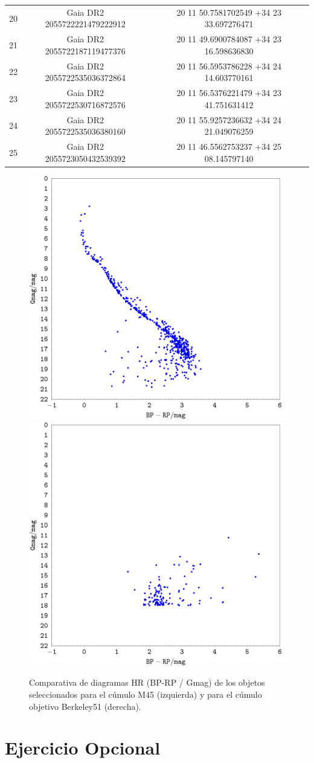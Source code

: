 \documentclass[a4paper,fleqn,usenatbib]{mnras}
\begin{document}
\begin{table}
{\begin{tabular}{c|c|c}
  20 & Gaia DR2 2055722221479222912 & 20 11 50.7581702549 +34 23 33.697276471 \\
  21 & Gaia DR2 2055722187119477376 & 20 11 49.6900784087 +34 23 16.598636830 \\
  22 & Gaia DR2 2055722535036372864 & 20 11 56.5953786228 +34 24 14.603770161 \\
  23 & Gaia DR2 2055722530716872576 & 20 11 56.5376221479 +34 23 41.751631412 \\
  24 & Gaia DR2 2055722535036380160 & 20 11 55.9257236632 +34 24 21.049076259 \\
  25 & Gaia DR2 2055723050432539392 & 20 11 46.5562753237 +34 25 08.145797140 \\
  \end{tabular}}
  \label{table:b51}
\end{table}

\begin{figure}
  \includegraphics[width=0.5\linewidth]{img/m45_b51_1}
  \includegraphics[width=0.5\linewidth]{img/m45_b51_2}
  \caption{Comparativa de diagramas HR (BP-RP / Gmag) de los objetos seleccionados para el cúmulo M45 (izquierda) y para el cúmulo objetivo Berkeley51 (derecha).}
  \label{fig:e2_m45_b51}
\end{figure}

\section{Ejercicio Opcional}
\end{document}
